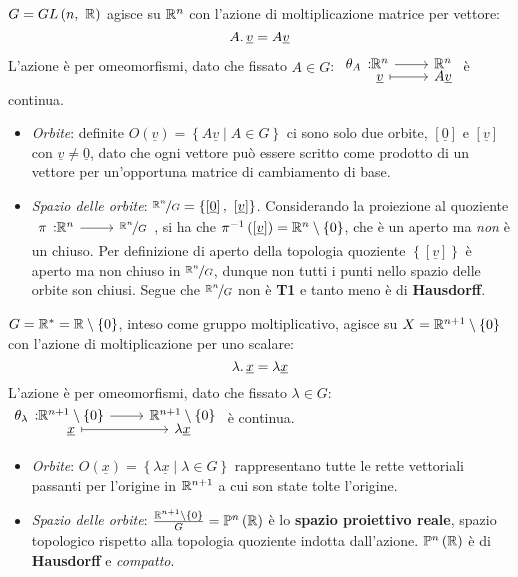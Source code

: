 \begin{example}
$G=GL\left(n,\ \mathbb{R}\right)$ agisce su $\mathbb{R}^n$ con l'azione di moltiplicazione matrice per vettore:
\begin{equation}
	A\ldotp \underline{v} = A\underline{v}
\end{equation}
L'azione è per omeomorfismi, dato che fissato $A\in G$: $\funztot{\theta_A}{\realset^n}{\realset^n}{\underline{v}}{A\underline{v}}$ è continua.
\begin{itemize}
	\item \textit{Orbite}: definite $O\left(\underline{v}\right)=\left\{A\underline{v}\mid A\in G\right\}$ ci sono solo due orbite, $\left[\underline{0}\right]$ e $\left[\underline{v}\right]$ con $\underline{v}\neq\underline{0}$, dato che ogni vettore può essere scritto come prodotto di un vettore per un'opportuna matrice di cambiamento di base.
	\item \textit{Spazio delle orbite}: $\nicefrac{\realset^n}{G}=\left\{\left[\underline{0}\right],\ \left[\underline{v}\right]\right\}$. Considerando la proiezione al quoziente $\funz{\pi}{\realset^n}{\nicefrac{\realset^n}{G}}$, si ha che $\pi^{-1}\left(\left[\underline{v}\right]\right)=\mathbb{R}^n\setminus\left\{0\right\}$, che è un aperto ma \textit{non} è un chiuso. Per definizione di aperto della topologia quoziente $\left\{\left[\underline{v}\right]\right\}$ è aperto ma non chiuso in $\nicefrac{\mathbb{R}^n}{G}$, dunque non tutti i punti nello spazio delle orbite son chiusi. Segue che $\nicefrac{\mathbb{R}^n}{G}$ non è \textbf{T1} e tanto meno è di \textbf{Hausdorff}.
\end{itemize}
\end{example}
\begin{example}
	$G=\mathbb{R}^{\ast}=\mathbb{R}\setminus\left\{0\right\}$, inteso come gruppo moltiplicativo, agisce su $X=\mathbb{R}^{n+1}\setminus\left\{0\right\}$ con l'azione di moltiplicazione per uno scalare:
	\begin{equation}
		\lambda\ldotp \underline{x} = \lambda\underline{x}
	\end{equation}
L'azione è per omeomorfismi, dato che fissato $\lambda\in G$: $\funztot{\theta_\lambda}{\realset^{n+1}\setminus\left\{0\right\}}{\realset^{n+1}\setminus\left\{0\right\}}{\underline{x}}{\lambda \underline{x}}$ è continua.
\begin{itemize}
	\item \textit{Orbite}: $O\left(\underline{x}\right)=\left\{\lambda \underline{x}\mid \lambda\in G\right\}$ rappresentano tutte le rette vettoriali passanti per l'origine in $\mathbb{R}^{n+1}$ a cui son state tolte l'origine.
	\item \textit{Spazio delle orbite}: $\frac{\mathbb{R}^{n+1}\setminus\left\{0\right\}}{G}=\mathbb{P}^n\left(\mathbb{R}\right)$ è lo \textbf{spazio proiettivo reale}, spazio topologico rispetto alla topologia quoziente indotta dall'azione. $\mathbb{P}^n\left(\mathbb{R}\right)$ è di \textbf{Hausdorff} e \textit{compatto}.
\end{itemize}
\end{example}
